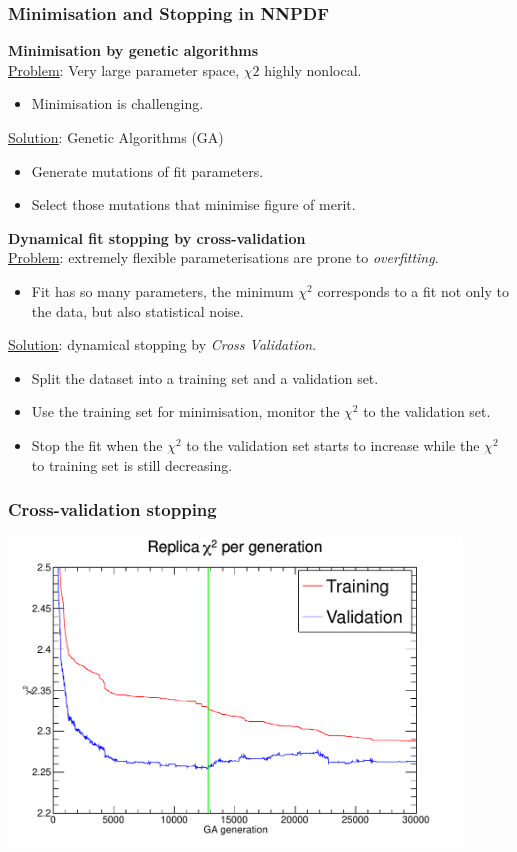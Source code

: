 \documentclass[10pt]{beamer}
\begin{document}
\begin{frame}
\small
\frametitle{Minimisation and Stopping in NNPDF}
\textbf{Minimisation by genetic algorithms}\\
\underline{Problem}: Very large parameter space, $\chi2$ highly nonlocal. \begin{itemize}
\item<1-> Minimisation is challenging.
\end{itemize}\underline{Solution}: Genetic Algorithms (GA)
\begin{itemize}
\item<1-> Generate mutations of fit parameters.
\item<1-> Select those mutations that minimise figure of merit.
\end{itemize}
\vskip10pt
\textbf{ Dynamical fit stopping by cross-validation}\\
\underline{Problem}:  extremely flexible parameterisations are prone to \emph{overfitting}.
\\
\begin{itemize}
\item<1->Fit has so many parameters, the minimum $\chi^2$ corresponds to a fit not only to
the data, but also statistical noise.
\end{itemize}
\underline{Solution}:  dynamical stopping by \emph{Cross Validation}.
\begin{itemize}
\item<1-> Split the dataset into a training set and a validation set.
\item<1-> Use the training set for minimisation, monitor the $\chi^2$ to the validation set.
\item<1-> Stop the fit when the $\chi^2$ to the validation set starts to increase while
the $\chi^2$ to training set is still decreasing.

\end{itemize}
\end{frame}

\begin{frame}
\frametitle{Cross-validation stopping}
	\begin{center}
   \includegraphics[width=0.9\textwidth]{figures/lookbackchi2prof.pdf}
   \end{center}
 \end{frame} 
\end{document}
